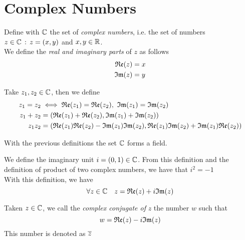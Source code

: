 \documentclass[../complete.tex]{subfiles}
\begin{document}
\section{Complex Numbers}
\begin{dfn}
	Define with $\Cf$ the set of \textit{complex numbers}, i.e. the set of numbers $z\in\mathbb{C}\, :\,  z=(x,y)$ and $x,y\in\mathbb{R}$.\\
	We define the \textit{real and imaginary parts} of $z$ as follows
	\begin{equation}
		\begin{aligned}
			\mathfrak{Re}{(z)}&=x\\
			\mathfrak{Im}{(z)}&=y
		\end{aligned}
		\label{eq:realimaginarypart}
	\end{equation}
\end{dfn}
\begin{dfn}[Operations in $\Cf$]
	Take $z_1,z_2\in\mathbb{C}$, then we define
	\begin{equation*}
		\begin{aligned}
			z_1=z_2&\iff \real{(z_1)}=\real{(z_2)},\ \imaginary{(z_1)}=\imaginary{(z_2)}\\
			z_1+z_2&=(\real{(z_1)}+\real{(z_2)},\imaginary{(z_1)}+\imaginary{(z_2)})\\
			z_1z_2&=(\real{(z_1)}\real{(z_2)}-\imaginary{(z_1)}\imaginary{(z_2)},\real{(z_1)}\imaginary{(z_2)}+\imaginary{(z_1)}\real{(z_2)})
		\end{aligned}
	\end{equation*}
\end{dfn}
\begin{thm}
	With the previous definitions the set $\Cf$ forms a field.
\end{thm}
\begin{dfn}
	We define the imaginary unit $i=(0,1)\in\mathbb{C}$. From this definition and the definition of product of two complex numbers, we have that $i^2=-1$\\
	With this definition, we have
	\begin{equation}
		\forall z\in\mathbb{C}\quad z=\mathfrak{Re}{(z)}+i\mathfrak{Im}{(z)}
		\label{eq:complex}
	\end{equation}
\end{dfn}
\begin{dfn}
	Taken $z\in\mathbb{C}$, we call the \textit{complex conjugate of} $z$ the number $w$ such that
	\begin{equation}
		w=\mathfrak{Re}{(z)}-i\mathfrak{Im}{(z)}
		\label{eq:complexcon}
	\end{equation}
	This number is denoted as $\overline{z}$
\end{dfn}
\end{document}
